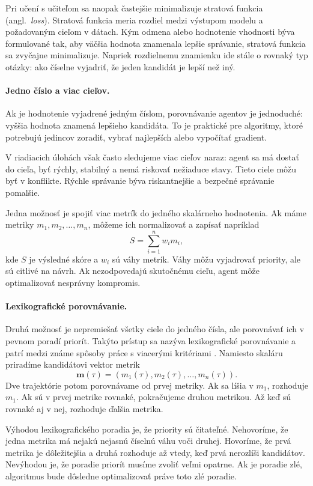 Pri učení s učiteľom sa naopak častejšie minimalizuje stratová funkcia (angl.~\emph{loss}). Stratová funkcia meria rozdiel medzi výstupom modelu a požadovaným cieľom v dátach. Kým odmena alebo hodnotenie vhodnosti býva formulované tak, aby väčšia hodnota znamenala lepšie správanie, stratová funkcia sa zvyčajne minimalizuje. Napriek rozdielnemu znamienku ide stále o rovnaký typ otázky: ako číselne vyjadriť, že jeden kandidát je lepší než iný.

\paragraph{Jedno číslo a viac cieľov.}
Ak je hodnotenie vyjadrené jedným číslom, porovnávanie agentov je jednoduché: vyššia hodnota znamená lepšieho kandidáta. To je praktické pre algoritmy, ktoré potrebujú jedincov zoradiť, vybrať najlepších alebo vypočítať gradient.

V riadiacich úlohách však často sledujeme viac cieľov naraz: agent sa má dostať do cieľa, byť rýchly, stabilný a nemá riskovať nežiaduce stavy. Tieto ciele môžu byť v konflikte. Rýchle správanie býva riskantnejšie a bezpečné správanie pomalšie.

Jedna možnosť je spojiť viac metrík do jedného skalárneho hodnotenia. Ak máme metriky $m_1, m_2, \ldots, m_n$, môžeme ich normalizovať a zapísať napríklad
\[
    S = \sum_{i=1}^{n} w_i m_i,
\]
kde $S$ je výsledné skóre a $w_i$ sú váhy metrík. Váhy môžu vyjadrovať priority, ale sú citlivé na návrh. Ak nezodpovedajú skutočnému cieľu, agent môže optimalizovať nesprávny kompromis.

\paragraph{Lexikografické porovnávanie.}
Druhá možnosť je nepremiešať všetky ciele do jedného čísla, ale porovnávať ich v pevnom poradí priorít. Takýto prístup sa nazýva lexikografické porovnávanie a patrí medzi známe spôsoby práce s viacerými kritériami \cite{ehrgott2005multicriteria}. Namiesto skaláru priradíme kandidátovi vektor metrík
\[
    \mathbf{m}(\tau) = (m_1(\tau), m_2(\tau), \ldots, m_n(\tau)).
\]
Dve trajektórie potom porovnávame od prvej metriky. Ak sa líšia v $m_1$, rozhoduje $m_1$. Ak sú v prvej metrike rovnaké, pokračujeme druhou metrikou. Až keď sú rovnaké aj v nej, rozhoduje ďalšia metrika.

Výhodou lexikografického poradia je, že priority sú čitateľné. Nehovoríme, že jedna metrika má nejakú nejasnú číselnú váhu voči druhej. Hovoríme, že prvá metrika je dôležitejšia a druhá rozhoduje až vtedy, keď prvá nerozlíši kandidátov. Nevýhodou je, že poradie priorít musíme zvoliť veľmi opatrne. Ak je poradie zlé, algoritmus bude dôsledne optimalizovať práve toto zlé poradie.

